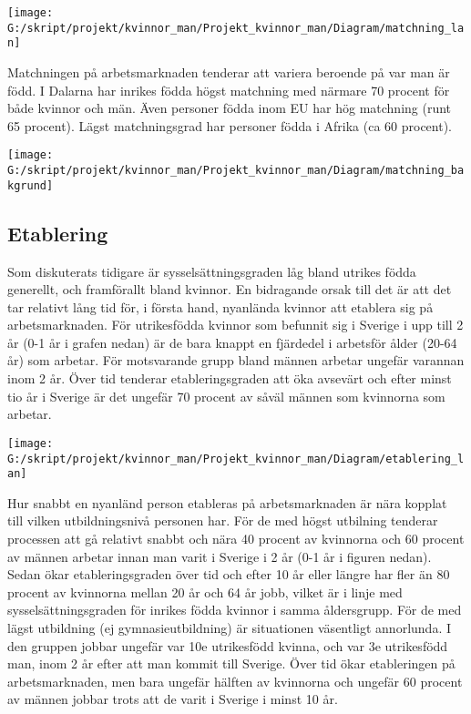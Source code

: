\documentclass[
]{article}
\begin{document}
\begin{center}\texttt{[image: G:/skript/projekt/kvinnor\_man/Projekt\_kvinnor\_man/Diagram/matchning\_lan]} \end{center}

Matchningen på arbetsmarknaden tenderar att variera beroende på var man
är född. I Dalarna har inrikes födda högst matchning med närmare 70
procent för både kvinnor och män. Även personer födda inom EU har hög
matchning (runt 65 procent). Lägst matchningsgrad har personer födda i
Afrika (ca 60 procent).

\begin{center}\texttt{[image: G:/skript/projekt/kvinnor\_man/Projekt\_kvinnor\_man/Diagram/matchning\_bakgrund]} \end{center}

\hypertarget{etablering}{%
\subsection{Etablering}\label{etablering}}

Som diskuterats tidigare är sysselsättningsgraden låg bland utrikes
födda generellt, och framförallt bland kvinnor. En bidragande orsak till
det är att det tar relativt lång tid för, i första hand, nyanlända
kvinnor att etablera sig på arbetsmarknaden. För utrikesfödda kvinnor
som befunnit sig i Sverige i upp till 2 år (0-1 år i grafen nedan) är de
bara knappt en fjärdedel i arbetsför ålder (20-64 år) som arbetar. För
motsvarande grupp bland männen arbetar ungefär varannan inom 2 år. Över
tid tenderar etableringsgraden att öka avsevärt och efter minst tio år i
Sverige är det ungefär 70 procent av såväl männen som kvinnorna som
arbetar.

\begin{center}\texttt{[image: G:/skript/projekt/kvinnor\_man/Projekt\_kvinnor\_man/Diagram/etablering\_lan]} \end{center}

Hur snabbt en nyanländ person etableras på arbetsmarknaden är nära
kopplat till vilken utbildningsnivå personen har. För de med högst
utbilning tenderar processen att gå relativt snabbt och nära 40 procent
av kvinnorna och 60 procent av männen arbetar innan man varit i Sverige
i 2 år (0-1 år i figuren nedan). Sedan ökar etableringsgraden över tid
och efter 10 år eller längre har fler än 80 procent av kvinnorna mellan
20 år och 64 år jobb, vilket är i linje med sysselsättningsgraden för
inrikes födda kvinnor i samma åldersgrupp. För de med lägst utbildning
(ej gymnasieutbildning) är situationen väsentligt annorlunda. I den
gruppen jobbar ungefär var 10e utrikesfödd kvinna, och var 3e
utrikesfödd man, inom 2 år efter att man kommit till Sverige. Över tid
ökar etableringen på arbetsmarknaden, men bara ungefär hälften av
kvinnorna och ungefär 60 procent av männen jobbar trots att de varit i
Sverige i minst 10 år.
\end{document}
